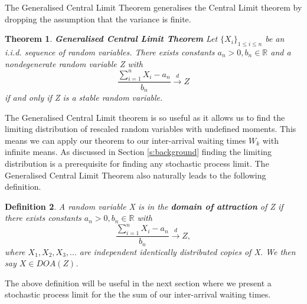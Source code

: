 \documentclass[honours,12pt]{UNSWthesis}
\newcommand{\R}{\mathbb{R}}
\newcommand{\1}{\mathbf 1}
\newtheorem{theorem}{Theorem}[section]
\newtheorem{definition}[theorem]{Definition}
\numberwithin{equation}{section}
\theoremstyle{definition}
\theoremstyle{remark}
\begin{document}
\noindent The Generalised Central Limit Theorem generalises the Central Limit theorem by dropping the assumption that the variance is finite.\\

\begin{theorem}
\textbf{Generalised Central Limit Theorem} Let $\{X_i\}_{1\leq i \leq n}$ be an i.i.d. sequence of random variables. There exists constants $a_n>0, b_n \in \R$ and a nondegenerate random variable Z with 
\[
	\frac{\sum^n_{i=1}X_i-a_n}{b_n} \overset{d}{\longrightarrow}Z
\]
if and only if Z is a stable random variable.\\
\end{theorem}

\noindent The Generalised Central Limit theorem is so useful as it allows us to find the limiting distribution of rescaled random variables with undefined moments. This means we can apply our theorem to our inter-arrival waiting times $W_k$ with infinite means. As discussed in Section \ref{s:background} finding the limiting distribution is a prerequisite for finding any stochastic process limit. The Generalised Central Limit Theorem also naturally leads to the following definition.\\

\begin{definition}\cite{nolan}
	A random variable X is in the \textbf{domain of attraction} of Z if there exists constants $a_n>0,b_n\in\R$ with
	\[
		\frac{\sum^n_{i=1}X_i-a_n}{b_n} \overset{d}{\longrightarrow}Z,
	\]
	where $X_1,X_2,X_3,...$ are independent identically distributed copies of X. We then say $X\in DOA(Z)$.\\
\end{definition}

\noindent The above definition will be useful in the next section where we present a stochastic process limit for the the sum of our inter-arrival waiting times.\\
\end{document}
